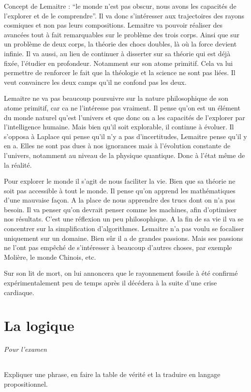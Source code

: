 Concept de Lemaitre : ``le monde n'est pas obscur, nous avons les capacités de l'explorer et de le comprendre''.
 Il va donc s'intéresser aux trajectoires des rayons cosmiques et non pas leurs compositions.
Lemaitre va pouvoir réaliser des avancées tout à fait remarquables sur le problème des trois corps.
Ainsi que sur un problème de deux corps, la théorie des chocs doubles, là où la force devient infinie.
Il va aussi, au lieu de continuer à disserter sur sa théorie qui est déjà fixée, l'étudier en profondeur.
Notamment sur son atome primitif.
Cela va lui permettre de renforcer le fait que la théologie et la science ne sont pas liées.
Il veut convaincre les deux camps qu'il ne confond pas les deux.

Lemaitre ne va pas beaucoup poursuivre sur la nature philosophique de son atome primitif, car ca ne l'intéresse pas vraiment.
Il pense qu'on est un élément du monde naturel qu'est l'univers et que donc on a les capacités de l'explorer par l'intelligence humaine.
Mais bien qu'il soit explorable, il continue à évoluer.
Il s'opposa à Laplace qui pense qu'il n'y a pas d'incertitudes, Lemaitre pense qu'il y en a.
Elles ne sont pas dues à nos ignorances mais à l'évolution constante de l'univers, notamment au niveau de la physique quantique.
Donc à l'état même de la réalité.

Pour explorer le monde il s'agit de nous faciliter la vie.
Bien que sa théorie ne soit pas accessible à tout le monde.
Il pense qu'on apprend les mathématiques d'une mauvaise façon.
A la place de nous apprendre des trucs dont on n'a pas besoin.
Il va penser qu'on devrait penser comme les machines, afin d'optimiser nos résultats.
C'est une réflexion un peu philosophique.
A la fin de sa vie il va se concentrer sur la simplification d'algorithmes.
Lemaitre n'a pas voulu se focaliser uniquement sur un domaine.
Bien sûr il a de grandes passions.
Mais ses passions ne l'ont pas empêché de s'intéresser à beaucoup d'autres choses, par exemple Molière, le monde Chinois, etc.

Sur son lit de mort, on lui annoncera que le rayonnement fossile à été confirmé expérimentalement peu de temps après il décédera à la suite d'une crise cardiaque.

\part{La logique}
\paragraph{Pour l'examen}
Expliquer une phrase, en faire la table de vérité et la traduire en langage propositionnel.


